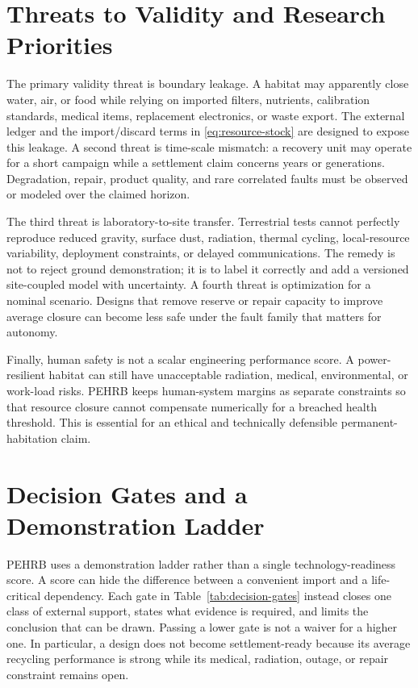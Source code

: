 \documentclass[10pt,conference]{IEEEtran}
\begin{document}
\section{Threats to Validity and Research Priorities}
\label{sec:validity}

The primary validity threat is boundary leakage. A habitat may apparently close water, air, or food while relying on imported filters, nutrients, calibration standards, medical items, replacement electronics, or waste export. The external ledger and the import/discard terms in \eqref{eq:resource-stock} are designed to expose this leakage. A second threat is time-scale mismatch: a recovery unit may operate for a short campaign while a settlement claim concerns years or generations. Degradation, repair, product quality, and rare correlated faults must be observed or modeled over the claimed horizon.

The third threat is laboratory-to-site transfer. Terrestrial tests cannot perfectly reproduce reduced gravity, surface dust, radiation, thermal cycling, local-resource variability, deployment constraints, or delayed communications. The remedy is not to reject ground demonstration; it is to label it correctly and add a versioned site-coupled model with uncertainty. A fourth threat is optimization for a nominal scenario. Designs that remove reserve or repair capacity to improve average closure can become less safe under the fault family that matters for autonomy.

Finally, human safety is not a scalar engineering performance score. A power-resilient habitat can still have unacceptable radiation, medical, environmental, or work-load risks. PEHRB keeps human-system margins as separate constraints so that resource closure cannot compensate numerically for a breached health threshold. This is essential for an ethical and technically defensible permanent-habitation claim.

\section{Decision Gates and a Demonstration Ladder}
\label{sec:gates}

PEHRB uses a demonstration ladder rather than a single technology-readiness score. A score can hide the difference between a convenient import and a life-critical dependency. Each gate in Table~\ref{tab:decision-gates} instead closes one class of external support, states what evidence is required, and limits the conclusion that can be drawn. Passing a lower gate is not a waiver for a higher one. In particular, a design does not become settlement-ready because its average recycling performance is strong while its medical, radiation, outage, or repair constraint remains open.
\end{document}
